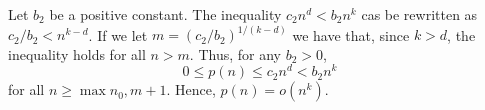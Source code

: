 Let $b_2$ be a positive constant.
The inequality $c_2n^d<b_2n^k$ cas be rewritten as $c_2/b_2<n^{k-d}$.
If we let $m=(c_2/b_2)^{1/(k-d)}$ we have that, since $k>d$, the inequality holds for all $n>m$.
Thus, for any $b_2>0$,
\[
    0 \le p(n) \le c_2n^d < b_2n^k
\]
for all $n\ge\max{n_0,m+1}$.
Hence, $p(n)=o(n^k)$.
